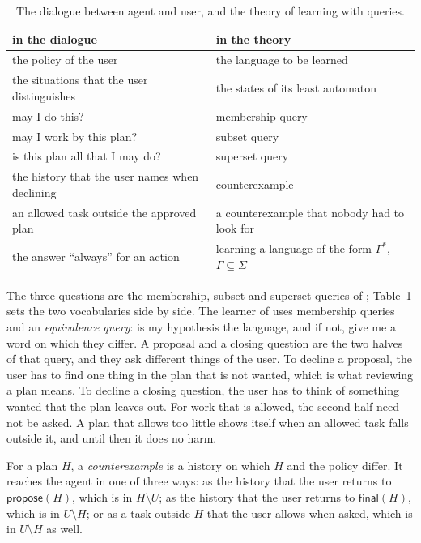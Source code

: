 \documentclass[acmsmall,nonacm,screen]{acmart}
\newcommand{\kw}[1]{\mathsf{#1}}
\newcommand{\propose}[1]{\kw{propose}(#1)}
\newcommand{\final}[1]{\kw{final}(#1)}
\begin{document}
\begin{table}
\caption{The dialogue between agent and user, and the theory of learning with queries.}
\label{tab:dictionary}
\small
\begin{tabular}{ll}
\toprule
in the dialogue & in the theory \\
\midrule
the policy of the user & the language to be learned \\
the situations that the user distinguishes & the states of its least automaton \\
may I do this? & membership query \\
may I work by this plan? & subset query \\
is this plan all that I may do? & superset query \\
the history that the user names when declining & counterexample \\
an allowed task outside the approved plan & a counterexample that nobody had to look for \\
the answer ``always'' for an action & learning a language of the form $\Gamma^{*}$, $\Gamma \subseteq \Sigma$ \\
\bottomrule
\end{tabular}
\end{table}

The three questions are the membership, subset and superset queries of
\citet{angluin1988}; Table~\ref{tab:dictionary} sets the two vocabularies side by side. The
learner of \citet{angluin1987} uses membership queries and an \emph{equivalence query}: is
my hypothesis the language, and if not, give me a word on which they differ. A proposal and a
closing question are the two halves of that query, and they ask different things of the
user. To decline a proposal, the user has to find one thing in the plan that is not wanted,
which is what reviewing a plan means. To decline a closing question, the user has to think of
something wanted that the plan leaves out. For work that is allowed, the second half need
not be asked. A plan that allows too little shows itself when an allowed task falls outside
it, and until then it does no harm.

\begin{definition}[Counterexample]
\label{def:cex}
For a plan $H$, a \emph{counterexample} is a history on which $H$ and the policy differ. It
reaches the agent in one of three ways: as the history that the user returns to
$\propose{H}$, which is in $H \setminus U$; as the history that the user returns to
$\final{H}$, which is in $U \setminus H$; or as a task outside $H$ that the user allows when
asked, which is in $U \setminus H$ as well.
\end{definition}
\end{document}

